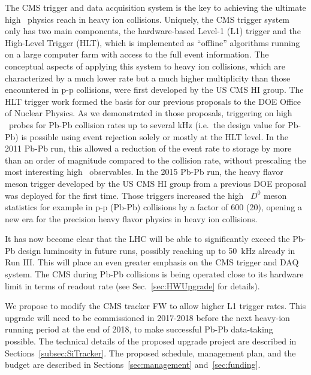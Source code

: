 The CMS trigger and data acquisition system is the key to achieving the ultimate high \pt\ physics reach in heavy ion collisions. Uniquely, the CMS trigger system only has two main components, the hardware-based Level-1 (L1) trigger and the High-Level Trigger (HLT), which is implemented as ``offline'' algorithms running on a large computer farm with access to the full event information.  
The conceptual aspects of applying this system to heavy ion collisions, which are characterized by a much lower rate but a much higher multiplicity than those encountered in p-p collisions, were first developed by the US CMS HI group. The HLT trigger work formed the basis for our previous proposals to the DOE Office of Nuclear Physics. As we demonstrated in those proposals, triggering on high \pt\ probes for Pb-Pb collision rates up to several kHz (i.e.\ the design value for Pb-Pb) is possible using event rejection solely or mostly at the HLT level. In the 2011 Pb-Pb run, this allowed a reduction of the event rate to storage by more than an order of magnitude compared to the collision rate, without prescaling the most interesting high \pt\ observables. In the 2015 Pb-Pb run, the heavy flavor meson trigger developed by the US CMS HI group from a previous DOE proposal was deployed for the first time. Those triggers increased the high \pt\ $D^0$ meson statistics for example in p-p (Pb-Pb) collisions by a factor of 600 (20), opening a new era for the precision heavy flavor physics in heavy ion collisions.

It has now become clear that the LHC will be able to significantly exceed the Pb-Pb design luminosity in future runs, possibly reaching up to 50~kHz already in Run III. This will place an even greater emphasis on the CMS trigger and DAQ system. The CMS during Pb-Pb collisions is being operated close to its hardware limit in terms of readout rate (see Sec.~\ref{sec:HWUpgrade} for details). 

We propose to modify the CMS tracker FW to allow higher L1 trigger rates. This upgrade will need to be commissioned in 2017-2018 before the next heavy-ion running period at the end of 2018, to make successful Pb-Pb data-taking possible. The technical details of the proposed upgrade project are described in Sections~\ref{subsec:SiTracker}. The proposed schedule, management plan, and the budget are described in Sections~\ref{sec:management} and~\ref{sec:funding}.

